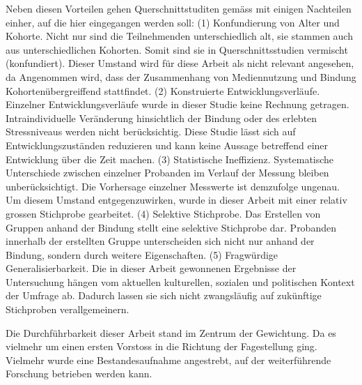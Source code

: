 Neben diesen Vorteilen gehen Querschnittstuditen gemäss  mit einigen Nachteilen einher, auf die hier eingegangen werden soll: (1) Konfundierung von Alter und Kohorte. Nicht nur sind die Teilnehmenden unterschiedlich alt, sie stammen auch aus unterschiedlichen Kohorten. Somit sind sie in Querschnittsstudien vermischt (konfundiert). Dieser Umstand wird für diese Arbeit als nicht relevant angesehen, da Angenommen wird, dass der Zusammenhang von Mediennutzung und Bindung Kohortenübergreiffend stattfindet. (2) Konstruierte Entwicklungsverläufe. Einzelner Entwicklungsverläufe wurde in dieser Studie keine Rechnung getragen. Intraindividuelle Veränderung hinsichtlich der Bindung oder des erlebten Stressniveaus werden nicht berücksichtig. Diese Studie lässt sich auf Entwicklungszuständen reduzieren und kann keine Aussage betreffend einer Entwicklung über die Zeit machen. (3) Statistische Ineffizienz. Systematische Unterschiede zwischen einzelner Probanden im Verlauf der Messung bleiben unberücksichtigt. Die Vorhersage einzelner Messwerte ist demzufolge ungenau. Um diesem Umstand entgegenzuwirken, wurde in dieser Arbeit mit einer relativ grossen Stichprobe gearbeitet. (4) Selektive Stichprobe. Das Erstellen von Gruppen anhand der Bindung stellt eine selektive Stichprobe dar. Probanden innerhalb der erstellten Gruppe unterscheiden sich nicht nur anhand der Bindung, sondern durch weitere Eigenschaften. (5) Fragwürdige Generalisierbarkeit. Die in dieser Arbeit gewonnenen Ergebnisse der Untersuchung hängen vom aktuellen kulturellen, sozialen und politischen Kontext der Umfrage ab. Dadurch lassen sie sich nicht zwangsläufig auf zukünftige Stichproben verallgemeinern. 

Die Durchführbarkeit dieser Arbeit stand im Zentrum der Gewichtung. Da es vielmehr um einen ersten Vorstoss in die Richtung der Fagestellung ging. Vielmehr wurde eine Bestandesaufnahme angestrebt, auf der weiterführende Forschung betrieben werden kann.

